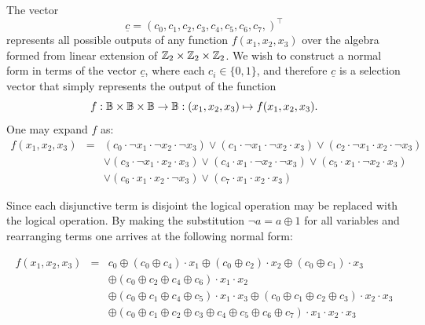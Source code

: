 \begin{example}

The vector
\begin{equation}
    \underline{c}=(c_0,c_1,c_2,c_3,c_4,c_5,c_6,c_7,)^\intercal
\end{equation}
represents
all possible outputs of any function $f(x_1,x_2,x_3)$ over the
algebra formed from linear extension of ${\mathbb Z}_2\times {\mathbb Z}_2\times {\mathbb Z}_2$.  We wish to
construct a normal form in terms of the vector $\underline{c}$, where each $c_i\in
\{0,1\}$, and therefore $\underline{c}$ is a selection vector
that simply represents the output of the function
\begin{equation}
    f:{\mathbb B}\times{\mathbb B}\times{\mathbb B}\rightarrow
{\mathbb B}:(x_1,x_2,x_3)\mapsto f(x_1,x_2,x_3). 
\end{equation}
One may expand $f$ as:
\begin{eqnarray}\label{eqn:generic}
f(x_1,x_2,x_3) &=& (c_0\cdot \neg x_1\cdot \neg x_2\cdot \neg
x_3)\vee(c_1\cdot \neg x_1\cdot \neg x_2\cdot x_3)\vee(c_2\cdot
\neg x_1\cdot x_2\cdot \neg x_3)\nonumber\\
&&\vee(c_3\cdot \neg x_1\cdot x_2\cdot x_3)\vee(c_4\cdot x_1\cdot
\neg x_2\cdot \neg x_3)\vee(c_5\cdot x_1\cdot
\neg x_2\cdot x_3)\nonumber\\
&&\vee(c_6\cdot x_1\cdot x_2\cdot \neg x_3)\vee(c_7\cdot x_1\cdot
x_2\cdot x_3)
\end{eqnarray}

Since each disjunctive term is disjoint the logical \OR{} operation may
be replaced with the logical \XOR{} operation.  By making the substitution $ \neg
a=a\oplus 1$ for all variables and rearranging terms one arrives at
the following normal form:

\begin{eqnarray}\label{eqn:generic2}
f(x_1,x_2,x_3) &=&c_0\oplus(c_0\oplus c_4)\cdot x_1\oplus(c_0\oplus
c_2)\cdot x_2\oplus(c_0\oplus c_1)\cdot x_3\\
&&\oplus(c_0\oplus
c_2\oplus c_4\oplus c_6)\cdot x_1\cdot
x_2\nonumber\\
&& \oplus(c_0\oplus c_1\oplus c_4 \oplus c_5)\cdot x_1\cdot
x_3\oplus(c_0 \oplus c_1 \oplus c_2 \oplus c_3)\cdot x_2\cdot x_3\nonumber\\
&&\oplus (c_0\oplus c_1\oplus c_2\oplus c_3\oplus c_4 \oplus c_5
\oplus c_6\oplus c_7)\cdot x_1\cdot x_2\cdot x_3
\end{eqnarray}


\end{example}
